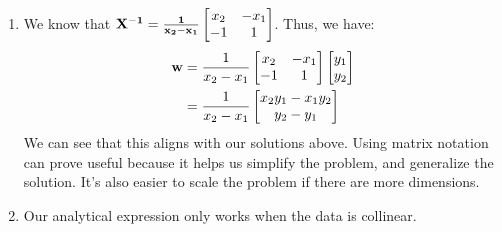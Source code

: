 \documentclass{harvardml}
\theoremstyle{definition}
\theoremstyle{plain}
\begin{document}
\begin{enumerate}
\item
    We know that $\bf{X^{-1}} = \frac{1}{x_2 - x_1}\begin{bmatrix}
        x_2 &   -x_1\\
        -1  &   1 
    \end{bmatrix}$. Thus, we have:
    \begin{align*}
       \bf{w} &= \frac{1}{x_2 - x_1}\begin{bmatrix}
        x_2 &   -x_1\\
        -1  &   1 
    \end{bmatrix}\begin{bmatrix}
        y_1\\
        y_2
    \end{bmatrix}\\
    &= \frac{1}{x_2 - x_1}\begin{bmatrix}
        x_2y_1 - x_1y_2\\
        y_2 - y_1
    \end{bmatrix}
    \end{align*}
    We can see that this aligns with our solutions above. Using matrix notation can prove useful because it helps us simplify the problem, and generalize the solution. It's also easier to scale the problem if there are more dimensions.

\item
    Our analytical expression only works when the data is collinear.
\end{enumerate}
\end{document}

